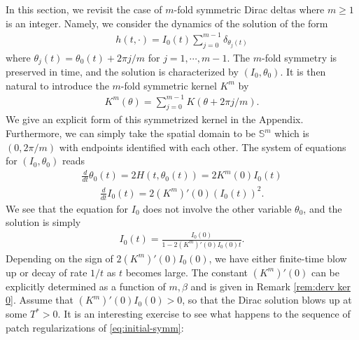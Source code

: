 \documentclass[10pt]{article}
\theoremstyle{definition}
\theoremstyle{remark}
\numberwithin{equation}{section}
\newcommand{\0}{\emptyset}
\newcommand{\bt}{\beta}
\newcommand{\dlt}{\delta}
\newcommand{\tht}{\theta}
\newcommand{\bbS}{\mathbb S}
\begin{document}
	In this section, we revisit the case of $m$-fold symmetric Dirac deltas where $m\ge1$ is an integer. Namely, we consider the dynamics of the solution of the form \begin{equation}\label{eq:initial-symm}
		\begin{split}
			h(t,\cdot) = I_{0}(t) \sum_{j=0}^{m-1} \dlt_{\tht_{j}(t)}
		\end{split}
	\end{equation} where $\tht_{j}(t) = \tht_{0}(t) + 2\pi j/m$ for $j = 1, \cdots, m-1$. The $m$-fold symmetry is preserved in time, and the solution is characterized by $(I_{0}, \tht_{0})$. It is then natural to introduce the $m$-fold symmetric kernel $K^{m}$ by \begin{equation*}
		\begin{split}
			K^{m}(\tht) = \sum_{j=0}^{m-1} K(\tht+ 2\pi j/m ). 
		\end{split}
	\end{equation*} We give an explicit form of this symmetrized kernel in the Appendix. Furthermore, we can simply take the spatial domain to be $\bbS^{m}$ which is $(0,2\pi/m)$ with endpoints identified with each other. The system of equations for $(I_{0}, \tht_{0})$ reads \begin{equation}\label{eq:dirac-m-fold-tht}
		\begin{split}
			\frac{d}{dt} \tht_{0}(t) = 2H(t,\tht_{0}(t)) = 2 K^{m}(0)I_{0}(t)
		\end{split}
	\end{equation} \begin{equation}\label{eq:dirac-m-fold-I}
		\begin{split}
			\frac{d}{dt} I_{0}(t) = 2 (K^{m})'(0) (I_{0}(t))^2. 
		\end{split}
	\end{equation} We see that the equation for $I_{0}$ does not involve the other variable $\tht_{0}$, and the solution is simply \begin{equation*}
		\begin{split}
			I_{0}(t) = \frac{I_{0}(0)}{1 - 2 (K^{m})'(0) I_{0}(0) t} . 
		\end{split}
	\end{equation*} Depending on the sign of $2 (K^{m})'(0) I_{0}(0)$, we have either finite-time blow up or decay of rate $1/t$ as $t$ becomes large. The constant $ (K^{m})'(0) $ can be explicitly determined as a function of $m,\bt$ and is given in Remark \ref{rem:derv ker 0}. Assume that $ (K^{m})'(0) I_{0}(0) > 0$, so that the Dirac solution blows up at some $T^*>0$. It is an interesting exercise to see what happens to the sequence of patch regularizations of \eqref{eq:initial-symm}: \begin{equation}\label{eq:initial-patch}

\end{equation}
\end{document}
